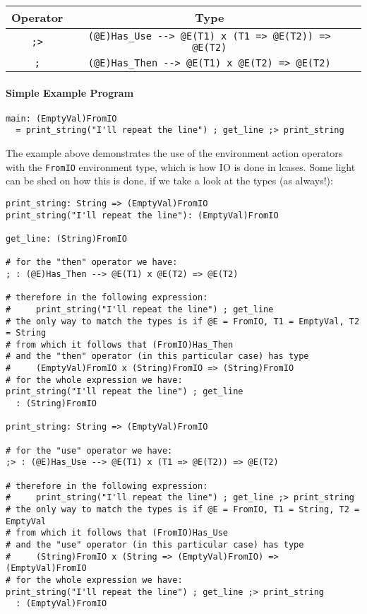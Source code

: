 \documentclass{article}
\begin{document}
\begin{center}
\begin{tabular}{ |c|c|c| } 
\hline
Operator & Type
\\ 
\hline
\hline
\verb|;>| & \verb|(@E)Has_Use --> @E(T1) x (T1 => @E(T2)) => @E(T2)|
\\
\hline
\verb|;| & \verb|(@E)Has_Then --> @E(T1) x @E(T2) => @E(T2)|
\\
\hline
\end{tabular}
\end{center}

\paragraph{Simple Example Program}
\begin{verbatim}
main: (EmptyVal)FromIO
  = print_string("I'll repeat the line") ; get_line ;> print_string
\end{verbatim}
The example above demonstrates the use of the environment action operators with
the \verb|FromIO| environment type, which is how IO is done in lcases. Some
light can be shed on how this is done, if we take a look at the types (as
always!):
\begin{verbatim}
print_string: String => (EmptyVal)FromIO
print_string("I'll repeat the line"): (EmptyVal)FromIO

get_line: (String)FromIO

# for the "then" operator we have:
; : (@E)Has_Then --> @E(T1) x @E(T2) => @E(T2) 

# therefore in the following expression:
#     print_string("I'll repeat the line") ; get_line
# the only way to match the types is if @E = FromIO, T1 = EmptyVal, T2 = String
# from which it follows that (FromIO)Has_Then
# and the "then" operator (in this particular case) has type
#     (EmptyVal)FromIO x (String)FromIO => (String)FromIO 
# for the whole expression we have:
print_string("I'll repeat the line") ; get_line
  : (String)FromIO

print_string: String => (EmptyVal)FromIO

# for the "use" operator we have:
;> : (@E)Has_Use --> @E(T1) x (T1 => @E(T2)) => @E(T2) 

# therefore in the following expression:
#     print_string("I'll repeat the line") ; get_line ;> print_string
# the only way to match the types is if @E = FromIO, T1 = String, T2 = EmptyVal
# from which it follows that (FromIO)Has_Use
# and the "use" operator (in this particular case) has type
#     (String)FromIO x (String => (EmptyVal)FromIO) => (EmptyVal)FromIO 
# for the whole expression we have:
print_string("I'll repeat the line") ; get_line ;> print_string
  : (EmptyVal)FromIO
\end{verbatim}
\end{document}
